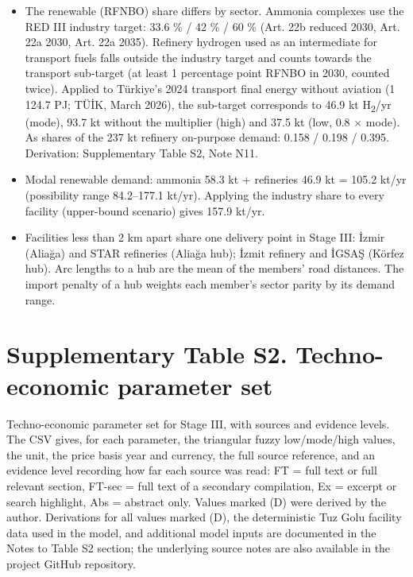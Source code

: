 \documentclass[11pt,a4paper]{article}
\begin{document}
\begin{itemize}\setlength\itemsep{1pt}

  \item The renewable (RFNBO) share differs by sector. Ammonia complexes use the RED III industry target: 33.6 \% / 42 \% / 60 \% (Art. 22b reduced 2030, Art. 22a 2030, Art. 22a 2035). Refinery hydrogen used as an intermediate for transport fuels falls outside the industry target and counts towards the transport sub-target (at least 1 percentage point RFNBO in 2030, counted twice). Applied to Türkiye's 2024 transport final energy without aviation (1 124.7 PJ; TÜİK, March 2026), the sub-target corresponds to 46.9 kt H\textsubscript{2}/yr (mode), 93.7 kt without the multiplier (high) and 37.5 kt (low, 0.8 $\times$ mode). As shares of the 237 kt refinery on-purpose demand: 0.158 / 0.198 / 0.395. Derivation: Supplementary Table S2, Note N11.

  \item Modal renewable demand: ammonia 58.3 kt + refineries 46.9 kt = 105.2 kt/yr (possibility range 84.2--177.1 kt/yr). Applying the industry share to every facility (upper-bound scenario) gives 157.9 kt/yr.

  \item Facilities less than 2 km apart share one delivery point in Stage III: İzmir (Aliağa) and STAR refineries (Aliağa hub); İzmit refinery and İGSAŞ (Körfez hub). Arc lengths to a hub are the mean of the members' road distances. The import penalty of a hub weights each member's sector parity by its demand range.

\end{itemize}

\newpage\section{Supplementary Table S2. Techno-economic parameter set}

Techno-economic parameter set for Stage III, with sources and evidence levels. The CSV gives, for each parameter, the triangular fuzzy low/mode/high values, the unit, the price basis year and currency, the full source reference, and an evidence level recording how far each source was read: FT = full text or full relevant section, FT-sec = full text of a secondary compilation, Ex = excerpt or search highlight, Abs = abstract only. Values marked (D) were derived by the author. Derivations for all values marked (D), the deterministic Tuz Golu facility data used in the model, and additional model inputs are documented in the Notes to Table S2 section; the underlying source notes are also available in the project GitHub repository.
\end{document}
